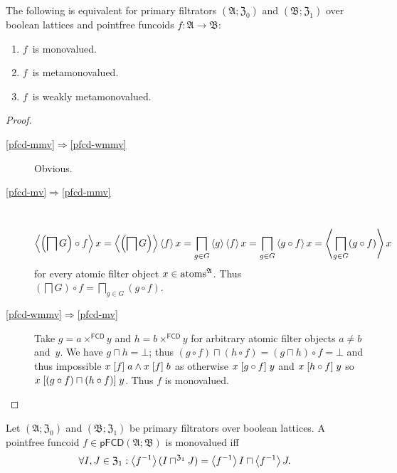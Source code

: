 \begin{thm}
The following is equivalent for primary filtrators $(\mathfrak{A};\mathfrak{Z}_{0})$
and $(\mathfrak{B};\mathfrak{Z}_{1})$ over boolean lattices and pointfree
funcoids $f:\mathfrak{A}\rightarrow\mathfrak{B}$:
\begin{enumerate}
\item \label{pfcd-mv}$f$~is monovalued.
\item \label{pfcd-mmv}$f$~is metamonovalued.
\item \label{pfcd-wmmv}$f$~is weakly metamonovalued.
\end{enumerate}
\end{thm}
\begin{proof}
~
\begin{description}
\item [{\ref{pfcd-mmv}$\Rightarrow$\ref{pfcd-wmmv}}] Obvious.
\item [{\ref{pfcd-mv}$\Rightarrow$\ref{pfcd-mmv}}] ~
\[
\left\langle \left(\bigsqcap G\right)\circ f\right\rangle x=\left\langle \left(\bigsqcap G\right)\right\rangle\left\langle f\right\rangle x=\bigsqcap_{g\in G}\left\langle g\right\rangle\left\langle f\right\rangle x=\bigsqcap_{g\in G}\left\langle g\circ f\right\rangle x=\left\langle \bigsqcap_{g\in G}(g\circ f)\right\rangle x
\]
for every atomic filter object $x\in\operatorname{atoms}^{\mathfrak{A}}$. Thus
$\left(\bigsqcap G\right)\circ f=\bigsqcap_{g\in G}(g\circ f)$.
\item [{\ref{pfcd-wmmv}$\Rightarrow$\ref{pfcd-mv}}] Take $g=a\times^{\mathsf{FCD}}y$
and $h=b\times^{\mathsf{FCD}}y$ for arbitrary atomic filter objects
$a\ne b$ and~$y$. We have $g\sqcap h=\bot$; thus $(g\circ f)\sqcap(h\circ f)=(g\sqcap h)\circ f=\bot$
and thus impossible $x\mathrel{\left[f\right]}a\land x\mathrel{\left[f\right]}b$ as otherwise $x\mathrel{\left[g\circ f\right]}y$
and $x\mathrel{\left[h\circ f\right]}y$ so $x\mathrel{\left[(g\circ f)\sqcap(h\circ f)\right]}y$.
Thus $f$ is monovalued.
\end{description}
\end{proof}
\begin{thm}
Let $(\mathfrak{A};\mathfrak{Z}_{0})$ and $(\mathfrak{B};\mathfrak{Z}_{1})$
be primary filtrators over boolean lattices. A pointfree funcoid
$f\in\mathsf{pFCD}(\mathfrak{A};\mathfrak{B})$ is monovalued iff
\[
\forall I,J\in\mathfrak{Z}_{1}:\left\langle f^{-1}\right\rangle(I\sqcap^{\mathfrak{Z}_{1}}J)=\left\langle f^{-1}\right\rangle I\sqcap\left\langle f^{-1}\right\rangle J.
\]
\end{thm}
